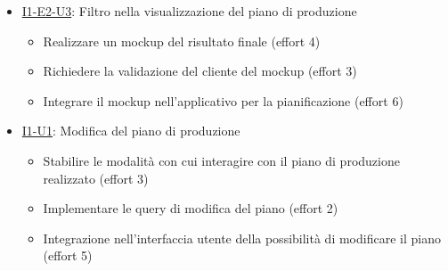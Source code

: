\begin{itemize}
\begin{itemize}
        \end{itemize}
  \item \hyperref[user-story:i1-e2-u3]{I1-E2-U3}: Filtro nella visualizzazione del piano di produzione
        \begin{itemize}
          \item Realizzare un mockup del risultato finale (effort 4)
          \item Richiedere la validazione del cliente del mockup (effort 3)
          \item Integrare il mockup nell'applicativo per la pianificazione (effort 6)
        \end{itemize}
  \item \hyperref[user-story:i1-u1]{I1-U1}: Modifica del piano di produzione
        \begin{itemize}
          \item Stabilire le modalità con cui interagire con il piano di produzione realizzato (effort 3)
          \item Implementare le query di modifica del piano (effort 2)
          \item Integrazione nell'interfaccia utente della possibilità di modificare il piano (effort 5)
        \end{itemize}
\end{itemize}

